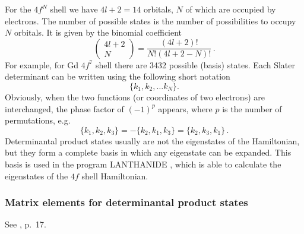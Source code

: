 \documentclass[a4paper,oneside,12pt]{extarticle}
\begin{document}
%
For the $4f^N$ shell we have $4l+2=14$ orbitals, $N$ of which are occupied by electrons. The number of possible states is the number of possibilities to occupy $N$ orbitals. It is given by the binomial coefficient
$$
\left(
\begin{array}{c}
4l+2 \\
N
\end{array}
\right) = \frac{(4l+2)!}{N!(4l+2-N)!} \,.
$$
%
For example, for Gd $4f^7$ shell there are 3432 possible (basis) states. Each Slater determinant can be written using the following short notation
%
$$
\{k_1, k_2, \ldots k_N\}.
$$
%
Obviously, when the two functions (or coordinates of two electrons) are interchanged, the phase factor of $(-1)^p$ appears, where $p$ is the number of permutations, e.g.
$$
\{k_1, k_2, k_3\} = - \{k_2, k_1, k_3\} = \{k_2, k_3, k_1\} \,.
$$
%
Determinantal product states usually are not the eigenstates of the Hamiltonian, but they form a complete basis in which any eigenstate can be expanded. This basis is used in the program LANTHANIDE \cite{Lanthanide_2001}, which is able to calculate the eigenstates of the $4f$ shell Hamiltonian.


\subsubsection {Matrix elements for determinantal product states}
%
See \cite{Judd}, p.~17.


\end{document}

